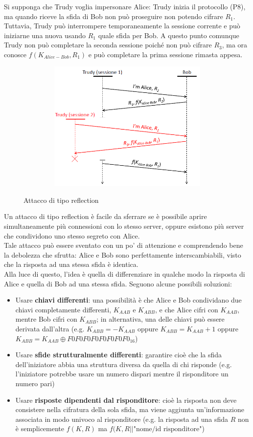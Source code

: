 Si supponga che Trudy voglia impersonare Alice: Trudy inizia il protocollo (P8), ma quando riceve la sfida di Bob non può proseguire non potendo cifrare $R_{1}$. Tuttavia, Trudy può interrompere temporaneamente la sessione corrente e può iniziarne una nuova usando $R_{1}$ quale sfida per Bob. A questo punto comunque Trudy non può completare la seconda sessione poiché non può cifrare $R_{3}$, ma ora conosce $f(K_{Alice-Bob},R_{1})$ e può completare la prima sessione rimasta appesa.
\begin{figure}[htbp]
	\centering%
	\subfigure%
	{\includegraphics[height=6.5cm, width=12cm, keepaspectratio]{Immagini/autenticazione/ImgS39bis.png}}
	\caption{Attacco di tipo reflection}\label{fig:ImgS39bis} 	
\end{figure}
Un attacco di tipo reflection è facile da sferrare se è possibile aprire simultaneamente più connessioni con lo
stesso server, oppure esistono più server che condividono uno stesso segreto con Alice.\\
Tale attacco può essere sventato con un po' di attenzione e comprendendo bene la debolezza che sfrutta: Alice e Bob sono perfettamente interscambiabili, visto che la risposta ad una stessa sfida è identica.\\
Alla luce di questo, l'idea è quella di differenziare in qualche modo la risposta di Alice e quella di Bob ad una stessa sfida. Seguono alcune possibili soluzioni:
\begin{itemize}
	\item Usare \textbf{chiavi differenti}: una possibilità è che Alice e Bob condividano due chiavi completamente differenti, $K_{AAB}$ e $K_{ABB}$, e che Alice cifri con $K_{AAB}$, mentre Bob cifri con $K_{ABB}$; in alternativa, una delle chiavi può essere derivata dall'altra (e.g. $K_{ABB} = -K_{AAB}$ oppure $K_{ABB} = K_{AAB} + 1$ oppure $K_{ABB} = K_{AAB} \oplus F0F0F0F0F0F0F0F0_{16}$)
	\item Usare \textbf{sfide strutturalmente differenti}: garantire cioè che la sfida dell'iniziatore abbia una struttura diversa da quella di chi risponde (e.g. l'iniziatore potrebbe usare un numero dispari mentre il risponditore un numero pari)
	\item Usare \textbf{risposte dipendenti dal risponditore}: cioè la risposta non deve consistere nella cifratura della sola sfida, ma viene aggiunta un'informazione associata in modo univoco al risponditore (e.g. la risposta ad una sfida $R$ non è semplicemente $f(K, R)$ ma $f(K, R||\text{"nome/id risponditore"}$)
\end{itemize}
